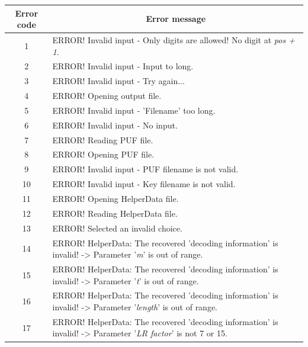\begin{table}[!ht]
\begin{center}
\begin{tabular}{cp{13cm}}
\toprule
\multicolumn{1}{c}{\textbf{Error code}} & \multicolumn{1}{c}{\textbf{Error message}} \\
\midrule
\hline
1 & ERROR! Invalid input - Only digits are allowed! No digit at \emph{pos + 1}.\\

2 & ERROR! Invalid input - Input to long. \\

3 & ERROR! Invalid input - Try again...  \\

4 & ERROR! Opening output file. \\

5 & ERROR! Invalid input - 'Filename' too long. \\

6 & ERROR! Invalid input - No input. \\

7 & ERROR! Reading PUF file. \\

8 & ERROR! Opening PUF file. \\

9 & ERROR! Invalid input - PUF filename is not valid.\\

10 & ERROR! Invalid input - Key filename is not valid.\\

11 & ERROR! Opening HelperData file. \\

12 & ERROR! Reading HelperData file. \\

13 & ERROR! Selected an invalid choice. \\

14 & ERROR! HelperData: The recovered 'decoding information' is invalid! -> Parameter '\emph{m}' is out of range.\\

15 & ERROR! HelperData: The recovered 'decoding information' is invalid! -> Parameter '\emph{t}' is out of range.\\

16 & ERROR! HelperData: The recovered 'decoding information' is invalid! -> Parameter '\emph{length}' is out of range.\\

17 & ERROR! HelperData: The recovered 'decoding information' is invalid! -> Parameter '\emph{LR factor}' is not 7 or 15.\\


\end{tabular}
\end{center}
\end{table}
